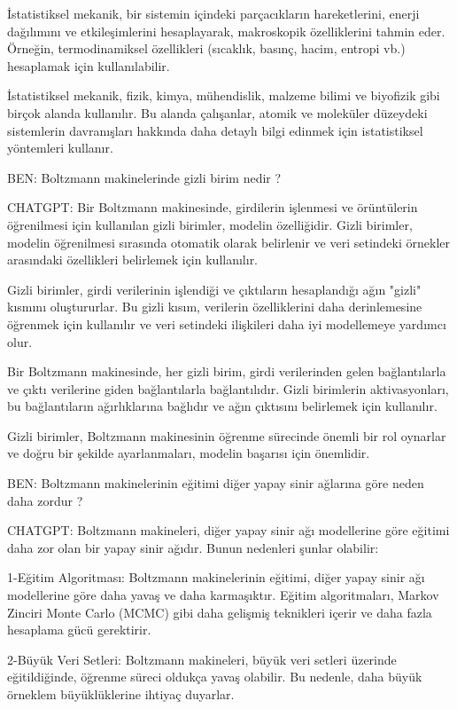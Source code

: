 \documentclass[11pt]{article}
\begin{document}
İstatistiksel mekanik, bir sistemin içindeki parçacıkların hareketlerini, enerji dağılımını ve etkileşimlerini hesaplayarak, makroskopik özelliklerini tahmin eder. Örneğin, termodinamiksel özellikleri (sıcaklık, basınç, hacim, entropi vb.) hesaplamak için kullanılabilir.

İstatistiksel mekanik, fizik, kimya, mühendislik, malzeme bilimi ve biyofizik gibi birçok alanda kullanılır. Bu alanda çalışanlar, atomik ve moleküler düzeydeki sistemlerin davranışları hakkında daha detaylı bilgi edinmek için istatistiksel yöntemleri kullanır.

BEN: Boltzmann makinelerinde gizli birim nedir ?

CHATGPT: Bir Boltzmann makinesinde, girdilerin işlenmesi ve örüntülerin öğrenilmesi için kullanılan gizli birimler, modelin özelliğidir. Gizli birimler, modelin öğrenilmesi sırasında otomatik olarak belirlenir ve veri setindeki örnekler arasındaki özellikleri belirlemek için kullanılır.

Gizli birimler, girdi verilerinin işlendiği ve çıktıların hesaplandığı ağın "gizli" kısmını oluştururlar. Bu gizli kısım, verilerin özelliklerini daha derinlemesine öğrenmek için kullanılır ve veri setindeki ilişkileri daha iyi modellemeye yardımcı olur.

Bir Boltzmann makinesinde, her gizli birim, girdi verilerinden gelen bağlantılarla ve çıktı verilerine giden bağlantılarla bağlantılıdır. Gizli birimlerin aktivasyonları, bu bağlantıların ağırlıklarına bağlıdır ve ağın çıktısını belirlemek için kullanılır.

Gizli birimler, Boltzmann makinesinin öğrenme sürecinde önemli bir rol oynarlar ve doğru bir şekilde ayarlanmaları, modelin başarısı için önemlidir.

BEN: Boltzmann makinelerinin eğitimi diğer yapay sinir ağlarına göre neden daha zordur ?

CHATGPT: Boltzmann makineleri, diğer yapay sinir ağı modellerine göre eğitimi daha zor olan bir yapay sinir ağıdır. Bunun nedenleri şunlar olabilir:

1-Eğitim Algoritması: Boltzmann makinelerinin eğitimi, diğer yapay sinir ağı modellerine göre daha yavaş ve daha karmaşıktır. Eğitim algoritmaları, Markov Zinciri Monte Carlo (MCMC) gibi daha gelişmiş teknikleri içerir ve daha fazla hesaplama gücü gerektirir.

2-Büyük Veri Setleri: Boltzmann makineleri, büyük veri setleri üzerinde eğitildiğinde, öğrenme süreci oldukça yavaş olabilir. Bu nedenle, daha büyük örneklem büyüklüklerine ihtiyaç duyarlar.
\end{document}
